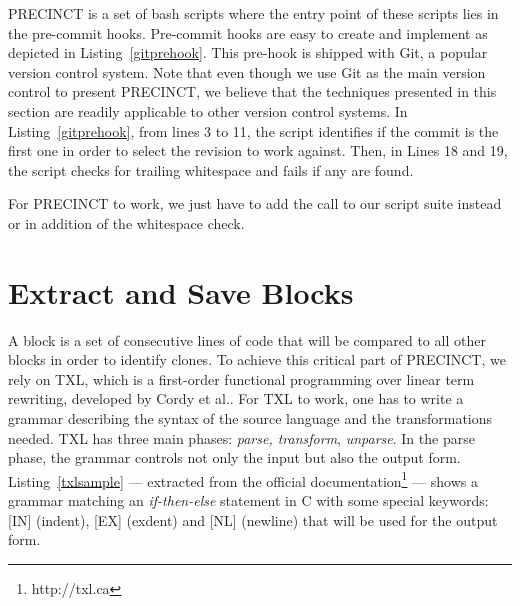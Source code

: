 PRECINCT is a set of bash scripts where the entry point of these scripts lies in the pre-commit hooks. Pre-commit hooks are easy to create and implement as depicted in Listing~\ref{gitprehook}.
This pre-hook is shipped with Git, a popular version control system.
Note that even though we use Git as the main version control to present PRECINCT, we believe that the techniques presented in this section are readily applicable to other version control systems.
In Listing~\ref{gitprehook}, from lines 3 to 11, the script identifies if the commit is the first one in order to select the revision to work against.
Then, in Lines 18 and 19, the script checks for trailing whitespace and fails if any are found.

For PRECINCT to work, we just have to add the call to our script suite instead or in addition of the whitespace check.

\noindent\begin{minipage}{0.90\linewidth}

  

\end{minipage}


\section{Extract and Save Blocks}
\label{sub:Extract and Save Blocks}

A block is a set of consecutive lines of code that will be compared to all other blocks in order to identify clones.
To achieve this critical part of PRECINCT, we rely on TXL\cite{Cordy2006a}, which is a first-order functional programming over linear term rewriting, developed by Cordy et al.\cite{Cordy2006a}.
For TXL to work, one has to write a grammar describing the syntax of the source  language and the transformations needed. TXL has three main phases: \textit{parse, transform}, \textit{unparse}.
In the parse phase, the grammar controls not only the input but also the output form.
Listing~\ref{txlsample} --- extracted from the official documentation\footnote{http://txl.ca} --- shows a grammar matching an \textit{if-then-else} statement in C with some special keywords: [IN] (indent), [EX] (exdent) and [NL] (newline) that will be used for the output form.

\noindent\begin{minipage}{0.90\linewidth}

  

\end{minipage}

